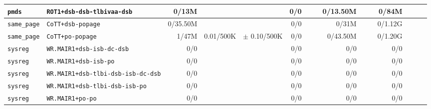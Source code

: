 \begin{tabular}{l l  | r r l | r r l | r r l | r r l l}
           \verb|pmds| &                             \verb|ROT1+dsb-dsb-tlbivaa-dsb| &          0/13M &                       &                   &            0/0 &                       &  &       0/13.50M &                       &                   &          0/84M &                       &                    & \\ \hline 
      \verb|same_page| &                                      \verb|CoTT+dsb-popage| &       0/35.50M &                       &                   &            0/0 &                       &  &          0/31M &                       &                   &        0/1.12G &                       &                    & \\ \hline 
      \verb|same_page| &                                       \verb|CoTT+po-popage| &          1/47M &             0.01/500K &   $\pm$ 0.10/500K &            0/0 &                       &  &       0/43.50M &                       &                   &        0/1.20G &                       &                    & \\ \hline 
         \verb|sysreg| &                              \verb|WR.MAIR1+dsb-isb-dc-dsb| &            0/0 &                       &                   &            0/0 &                       &  &            0/0 &                       &                   &            0/0 &                       &                    & \\ \hline 
         \verb|sysreg| &                                  \verb|WR.MAIR1+dsb-isb-po| &            0/0 &                       &                   &            0/0 &                       &  &            0/0 &                       &                   &            0/0 &                       &                    & \\ \hline 
         \verb|sysreg| &                     \verb|WR.MAIR1+dsb-tlbi-dsb-isb-dc-dsb| &            0/0 &                       &                   &            0/0 &                       &  &            0/0 &                       &                   &            0/0 &                       &                    & \\ \hline 
         \verb|sysreg| &                         \verb|WR.MAIR1+dsb-tlbi-dsb-isb-po| &            0/0 &                       &                   &            0/0 &                       &  &            0/0 &                       &                   &            0/0 &                       &                    & \\ \hline 
         \verb|sysreg| &                                       \verb|WR.MAIR1+po-po| &            0/0 &                       &                   &            0/0 &                       &  &            0/0 &                       &                   &            0/0 &                       &                    & \\ \hline 

\end{tabular}
